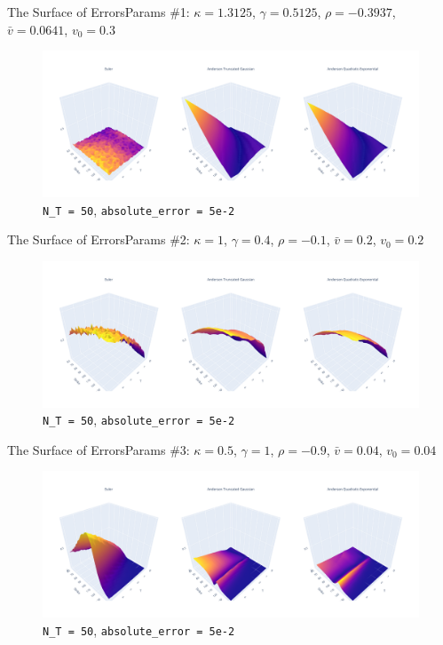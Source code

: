 \begin{frame}{The Surface of Errors}{Params \#1: $\kappa = 1.3125$, $\gamma = 0.5125$, $\rho = -0.3937$, $\bar v = 0.0641$, $v_0 = 0.3$}
    \begin{figure}
        \includegraphics[width=\textwidth]{part4/pictures/err_surface_strike_T_N_T=50_param1.pdf}
        \caption{\texttt{N\_T = 50}, \texttt{absolute\_error = 5e-2}}
    \end{figure}
\end{frame}

\begin{frame}{The Surface of Errors}{Params \#2: $\kappa = 1$, $\gamma = 0.4$, $\rho = -0.1$, $\bar v = 0.2$, $v_0 = 0.2$}
    \begin{figure}
        \includegraphics[width=\textwidth]{part4/pictures/err_surface_strike_T_N_T=50_param2.pdf}
        \caption{\texttt{N\_T = 50}, \texttt{absolute\_error = 5e-2}}
    \end{figure}
\end{frame}

\begin{frame}{The Surface of Errors}{Params \#3: $\kappa = 0.5$, $\gamma = 1$, $\rho = -0.9$, $\bar v = 0.04$, $v_0 = 0.04$}
    \begin{figure}
        \includegraphics[width=\textwidth]{part4/pictures/err_surface_strike_T_N_T=50_param3.pdf}
        \caption{\texttt{N\_T = 50}, \texttt{absolute\_error = 5e-2}}
    \end{figure}
\end{frame}

